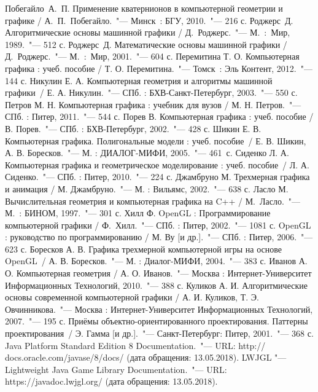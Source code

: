 \renewcommand{\bibname}{Список использованных источников}
\begin{thebibliography}{99}

 Побегайло~А.~П. Применение кватернионов в компьютерной геометрии и графике / А.~П.~Побегайло.~"--- Минск~: БГУ, 2010.~"--- 216 с.
 Роджерс~Д. Алгоритмические основы машинной графики / Д.~Роджерс.~"--- М.~:~Мир, 1989.~"--- 512 с.
 Роджерс~Д. Математические основы машинной графики / Д.~Роджерс.~"--- М.~:~Мир, 2001.~"--- 604 с.
 Перемитина Т. О. Компьютерная графика : учеб. пособие / Т. О. Перемитина.~"--- Томск~: Эль Контент, 2012.~"--- 144 с.
 Никулин Е. А. Компьютерная геометрия и алгоритмы машинной графики~/ Е. А. Никулин.~"--- СПб. : БХВ-Санкт-Петербург, 2003.~"--- 550 с.
 Петров М. Н. Компьютерная графика : учебник для вузов / М. Н. Петров.~"--- СПб. : Питер, 2011.~"--- 544 с.
 Порев В. Компьютерная графика : учеб. пособие / В. Порев.~"--- СПб. : БХВ-Петербург, 2002.~"--- 428 с.
 Шикин Е. В. Компьютерная графика. Полигональные модели : учеб. пособие~/ Е. В. Шикин, А. В. Боресков.~"--- М. : ДИАЛОГ-МИФИ, 2005.~"--- 461~с.
 Сиденко Л. А. Компьютерная графика и геометрическое моделирование : учеб. пособие~/ Л. А. Сиденко.~"--- СПб. : Питер, 2010.~"--- 224 с.
 Джамбруно М. Трехмерная графика и анимация / М. Джамбруно.~"--- М. : Вильямс, 2002.~"--- 638 с.
 Ласло М. Вычислительная геометрия и компьютерная графика на C++ / М.~Ласло.~"--- М.~: БИНОМ, 1997.~"--- 301 с.
 Хилл Ф. OpenGL : Программирование компьютерной графики / Ф.~Хилл.~"--- СПб. : Питер, 2002.~"--- 1081 с.
 OpenGL : руководство по программированию / М. Ву [и др.].~"--- СПб. : Питер, 2006.~"--- 623 с.
 Боресков А. В. Графика трехмерной компьютерной игры на основе OpenGL~/ А. В. Боресков.~"--- М. : Диалог-МИФИ, 2004.~"--- 383 с.
 Иванов А. О. Компьютерная геометрия / А. О. Иванов.~"--- Москва : Интернет-Университет Информационных Технологий, 2010.~"--- 388 с.
 Куликов А. И. Алгоритмические основы современной компьютерной графики / А. И. Куликов, Т. Э. Овчинникова.~"--- Москва : Интернет-Университет Информационных Технологий, 2007.~"--- 195 с.
 Приёмы объектно-ориентированного проектирования. Паттерны проектирования~/ Э. Гамма [и др.].~"---
Санкт-Петербург: Питер, 2001.~"--- 368 с.
 Java Platform Standard Edition 8 Documentation.~"--- URL: http:// docs.oracle.com/javase/8/docs/
(дата обращения: 13.05.2018).
 LWJGL "--- Lightweight Java Game Library Documentation.~"--- URL: https://javadoc.lwjgl.org/
(дата обращения: 13.05.2018).
\end{thebibliography}
